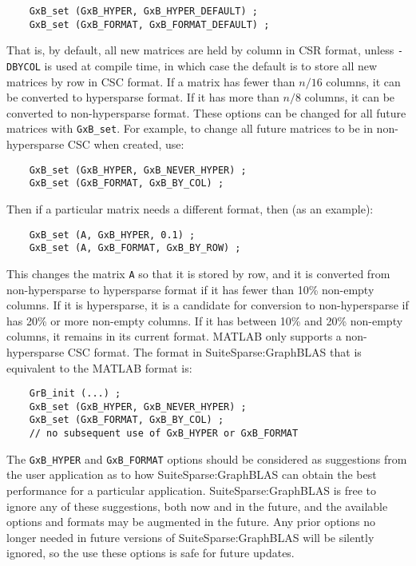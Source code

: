 \documentclass[12pt]{article}
\begin{document}
{\footnotesize
\begin{verbatim}
    GxB_set (GxB_HYPER, GxB_HYPER_DEFAULT) ;
    GxB_set (GxB_FORMAT, GxB_FORMAT_DEFAULT) ;
\end{verbatim} }

That is, by default, all new matrices are held by column in CSR format, unless
\verb'-DBYCOL' is used at compile time, in which case the default is to store
all new matrices by row in CSC format.  If a matrix has fewer than $n/16$
columns, it can be converted to hypersparse format.  If it has more than $n/8$
columns, it can be converted to non-hypersparse format.  These options can be
changed for all future matrices with \verb'GxB_set'.  For example, to change
all future matrices to be in non-hypersparse CSC when created, use:

{\footnotesize
\begin{verbatim}
    GxB_set (GxB_HYPER, GxB_NEVER_HYPER) ;
    GxB_set (GxB_FORMAT, GxB_BY_COL) ;
\end{verbatim} }

Then if a particular matrix needs a different format, then (as an example):

{\footnotesize
\begin{verbatim}
    GxB_set (A, GxB_HYPER, 0.1) ;
    GxB_set (A, GxB_FORMAT, GxB_BY_ROW) ;
\end{verbatim} }

This changes the matrix \verb'A' so that it is stored by row, and it is
converted from non-hypersparse to hypersparse format if it has fewer than 10\%
non-empty columns.  If it is hypersparse, it is a candidate for conversion to
non-hypersparse if has 20\% or more non-empty columns.  If it has between 10\%
and 20\% non-empty columns, it remains in its current format.
MATLAB only supports a non-hypersparse CSC format.  The format in
SuiteSparse:GraphBLAS that is equivalent to the MATLAB format is:

{\footnotesize
\begin{verbatim}
    GrB_init (...) ;
    GxB_set (GxB_HYPER, GxB_NEVER_HYPER) ;
    GxB_set (GxB_FORMAT, GxB_BY_COL) ;
    // no subsequent use of GxB_HYPER or GxB_FORMAT
\end{verbatim} }

The \verb'GxB_HYPER' and \verb'GxB_FORMAT' options should be considered as
suggestions from the user application as to how SuiteSparse:GraphBLAS can
obtain the best performance for a particular application.
SuiteSparse:GraphBLAS is free to ignore any of these suggestions, both now and
in the future, and the available options and formats may be augmented in the
future.  Any prior options no longer needed in future versions of
SuiteSparse:GraphBLAS will be silently ignored, so the use these options is
safe for future updates.
\end{document}
